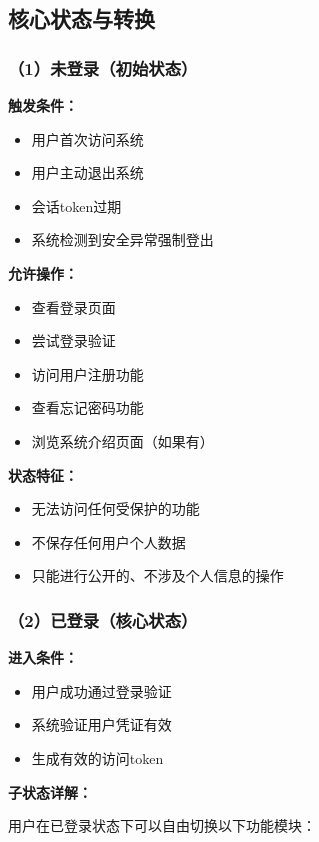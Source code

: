 \documentclass[a4paper]{article}
\begin{document}
\subsection{核心状态与转换}

\subsubsection{（1）未登录（初始状态）}

\textbf{触发条件：}
\begin{itemize}
    \item 用户首次访问系统
    \item 用户主动退出系统
    \item 会话token过期
    \item 系统检测到安全异常强制登出
\end{itemize}

\textbf{允许操作：}
\begin{itemize}
    \item 查看登录页面
    \item 尝试登录验证
    \item 访问用户注册功能
    \item 查看忘记密码功能
    \item 浏览系统介绍页面（如果有）
\end{itemize}

\textbf{状态特征：}
\begin{itemize}
    \item 无法访问任何受保护的功能
    \item 不保存任何用户个人数据
    \item 只能进行公开的、不涉及个人信息的操作
\end{itemize}

\subsubsection{（2）已登录（核心状态）}

\textbf{进入条件：}
\begin{itemize}
    \item 用户成功通过登录验证
    \item 系统验证用户凭证有效
    \item 生成有效的访问token
\end{itemize}

\textbf{子状态详解：}

用户在已登录状态下可以自由切换以下功能模块：
\end{document}
